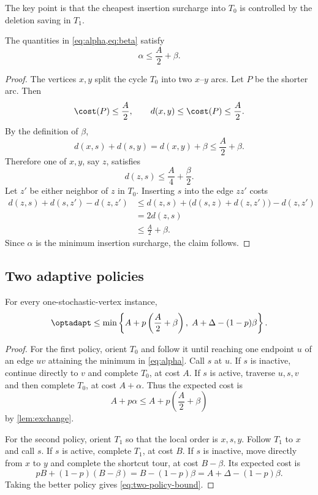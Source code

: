 The key point is that the cheapest insertion surcharge into $T_0$ is
controlled by the deletion saving in $T_1$.

\begin{lemma}\label{lem:exchange}
The quantities in \cref{eq:alpha,eq:beta} satisfy
\[
  \alpha\le\frac A2+\beta.
\]
\end{lemma}

\begin{proof}
The vertices $x,y$ split the cycle $T_0$ into two $x$--$y$ arcs.  Let $P$ be
the shorter arc.  Then
\[
  \cost(P)\le\frac A2,
  \qquad
  d(x,y)\le\cost(P)\le\frac A2.
\]
By the definition of $\beta$,
\[
  d(x,s)+d(s,y)=d(x,y)+\beta\le\frac A2+\beta.
\]
Therefore one of $x,y$, say $z$, satisfies
\[
  d(z,s)\le\frac A4+\frac\beta2.
\]
Let $z'$ be either neighbor of $z$ in $T_0$.  Inserting $s$ into the edge
$zz'$ costs
\[
\begin{aligned}
  d(z,s)+d(s,z')-d(z,z')
  &\le d(z,s)+\bigl(d(s,z)+d(z,z')\bigr)-d(z,z')\\
  &=2d(z,s)\\
  &\le\frac A2+\beta.
\end{aligned}
\]
Since $\alpha$ is the minimum insertion surcharge, the claim follows.
\end{proof}

\subsection{Two adaptive policies}

\begin{lemma}\label{lem:two-policies}
For every one-stochastic-vertex instance,
\begin{equation}\label{eq:two-policy-bound}
  \optadapt
  \le
  \min\left\{
    A+p\left(\frac A2+\beta\right),
    \;A+\Delta-(1-p)\beta
  \right\}.
\end{equation}
\end{lemma}

\begin{proof}
For the first policy, orient $T_0$ and follow it until reaching one endpoint
$u$ of an edge $uv$ attaining the minimum in \cref{eq:alpha}.  Call $s$ at
$u$.  If $s$ is inactive, continue directly to $v$ and complete $T_0$, at cost
$A$.  If $s$ is active, traverse $u,s,v$ and then complete $T_0$, at cost
$A+\alpha$.  Thus the expected cost is
\[
  A+p\alpha
  \le A+p\left(\frac A2+\beta\right)
\]
by \cref{lem:exchange}.

For the second policy, orient $T_1$ so that the local order is
$x,s,y$.  Follow $T_1$ to $x$ and call $s$.  If $s$ is active, complete
$T_1$, at cost $B$.  If $s$ is inactive, move directly from $x$ to $y$ and
complete the shortcut tour, at cost $B-\beta$.  Its expected cost is
\[
  pB+(1-p)(B-\beta)
  =B-(1-p)\beta
  =A+\Delta-(1-p)\beta.
\]
Taking the better policy gives \cref{eq:two-policy-bound}.
\end{proof}

